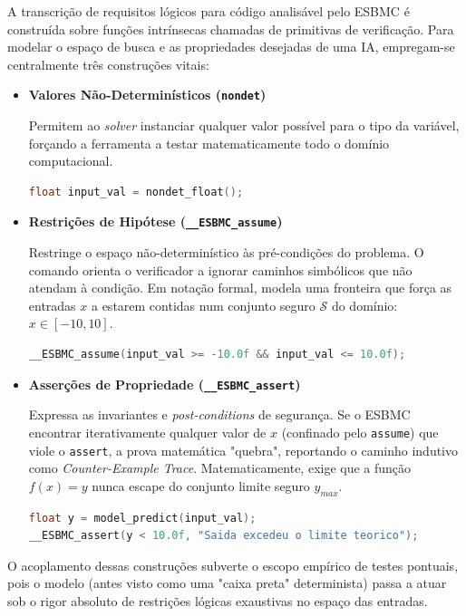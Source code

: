 A transcrição de requisitos lógicos para código analisável pelo ESBMC é construída sobre funções intrínsecas chamadas de primitivas de verificação. Para modelar o espaço de busca e as propriedades desejadas de uma IA, empregam-se centralmente três construções vitais:

\begin{itemize}
    \item \textbf{Valores Não-Determinísticos (\texttt{nondet})}
    
    Permitem ao \textit{solver} instanciar qualquer valor possível para o tipo da variável, forçando a ferramenta a testar matematicamente todo o domínio computacional.
    \begin{lstlisting}[language=C, numbers=none]
float input_val = nondet_float();
    \end{lstlisting}

    \item \textbf{Restrições de Hipótese (\texttt{\_\_ESBMC\_assume})}
    
    Restringe o espaço não-determinístico às pré-condições do problema. O comando orienta o verificador a ignorar caminhos simbólicos que não atendam à condição. Em notação formal, modela uma fronteira que força as entradas $x$ a estarem contidas num conjunto seguro $\mathcal{S}$ do domínio: $x \in [-10, 10]$.
    \begin{lstlisting}[language=C, numbers=none]
__ESBMC_assume(input_val >= -10.0f && input_val <= 10.0f);
    \end{lstlisting}

    \item \textbf{Asserções de Propriedade (\texttt{\_\_ESBMC\_assert})}
    
    Expressa as invariantes e \textit{post-conditions} de segurança. Se o ESBMC encontrar iterativamente qualquer valor de $x$ (confinado pelo \texttt{assume}) que viole o \texttt{assert}, a prova matemática "quebra", reportando o caminho indutivo como \textit{Counter-Example Trace}. Matematicamente, exige que a função $f(x) = y$ nunca escape do conjunto limite seguro $y_{max}$.
    \begin{lstlisting}[language=C, numbers=none]
float y = model_predict(input_val);
__ESBMC_assert(y < 10.0f, "Saida excedeu o limite teorico");
    \end{lstlisting}
\end{itemize}

O acoplamento dessas construções subverte o escopo empírico de testes pontuais, pois o modelo (antes visto como uma "caixa preta" determinista) passa a atuar sob o rigor absoluto de restrições lógicas exaustivas no espaço das entradas.

